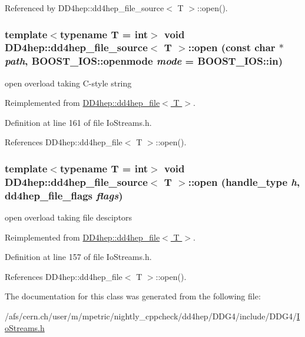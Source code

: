 Referenced by DD4hep::dd4hep\_\-file\_\-source$<$ T $>$::open().\hypertarget{class_d_d4hep_1_1dd4hep__file__source_ac9d66c792e2fa69fa7c9df98d8d45850}{
\subsubsection[{open}]{\setlength{\rightskip}{0pt plus 5cm}template$<$typename T = int$>$ void {\bf DD4hep::dd4hep\_\-file\_\-source}$<$ {\bf T} $>$::open (const char $\ast$ {\em path}, \/  BOOST\_\-IOS::openmode {\em mode} = {\ttfamily BOOST\_\-IOS::in})}}
\label{class_d_d4hep_1_1dd4hep__file__source_ac9d66c792e2fa69fa7c9df98d8d45850}


open overload taking C-\/style string 

Reimplemented from \hyperlink{class_d_d4hep_1_1dd4hep__file_a44e65364ed22ce152f237541e0391dcc}{DD4hep::dd4hep\_\-file$<$ T $>$}.

Definition at line 161 of file IoStreams.h.

References DD4hep::dd4hep\_\-file$<$ T $>$::open().\hypertarget{class_d_d4hep_1_1dd4hep__file__source_a367c212f20de3cfe79b5e69403a5a256}{
\subsubsection[{open}]{\setlength{\rightskip}{0pt plus 5cm}template$<$typename T = int$>$ void {\bf DD4hep::dd4hep\_\-file\_\-source}$<$ {\bf T} $>$::open ({\bf handle\_\-type} {\em h}, \/  {\bf dd4hep\_\-file\_\-flags} {\em flags})}}
\label{class_d_d4hep_1_1dd4hep__file__source_a367c212f20de3cfe79b5e69403a5a256}


open overload taking file desciptors 

Reimplemented from \hyperlink{class_d_d4hep_1_1dd4hep__file_a5f7da6679da9dbc31f37c85e51d7dd94}{DD4hep::dd4hep\_\-file$<$ T $>$}.

Definition at line 157 of file IoStreams.h.

References DD4hep::dd4hep\_\-file$<$ T $>$::open().

The documentation for this class was generated from the following file:\begin{DoxyCompactItemize}
\item 
/afs/cern.ch/user/m/mpetric/nightly\_\-cppcheck/dd4hep/DDG4/include/DDG4/\hyperlink{_io_streams_8h}{IoStreams.h}\end{DoxyCompactItemize}
